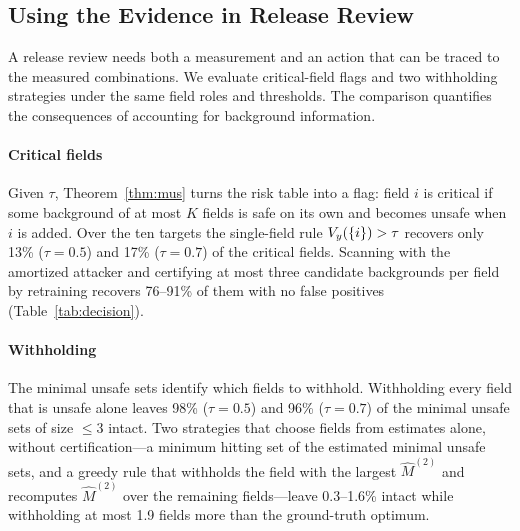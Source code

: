 \subsection{Using the Evidence in Release Review}\label{sec:application}

A release review needs both a measurement and an action that can be traced to the measured combinations. We evaluate critical-field flags and two withholding strategies under the same field roles and thresholds. The comparison quantifies the consequences of accounting for background information.

\paragraph{Critical fields}
Given $\tau$, Theorem~\ref{thm:mus} turns the risk table into a flag: field $i$ is critical if some
background of at most $K$ fields is safe on its own and becomes unsafe when $i$ is added. Over the ten
targets the single-field rule $V_y(\{i\})>\tau$ recovers only 13\% ($\tau=0.5$) and 17\% ($\tau=0.7$) of
the critical fields. Scanning with the amortized attacker and certifying at most three candidate
backgrounds per field by retraining recovers 76--91\% of them with no false positives
(Table~\ref{tab:decision}).

\paragraph{Withholding}
The minimal unsafe sets identify which fields to withhold. Withholding every field that is unsafe
alone leaves 98\% ($\tau=0.5$) and 96\% ($\tau=0.7$) of the minimal unsafe sets of size $\le3$ intact.
Two strategies that choose fields from estimates alone, without certification---a minimum hitting set of the estimated
minimal unsafe sets, and a greedy rule that withholds the field with the largest $\hat M^{(2)}$ and
recomputes $\hat M^{(2)}$ over the remaining fields---leave 0.3--1.6\% intact while withholding at most
1.9 fields more than the ground-truth optimum.

